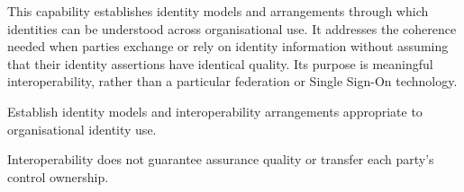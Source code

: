 This capability establishes identity models and arrangements through which identities can be understood across organisational use. It addresses the coherence needed when parties exchange or rely on identity information without assuming that their identity assertions have identical quality. Its purpose is meaningful interoperability, rather than a particular federation or Single Sign-On technology.



Establish identity models and interoperability arrangements appropriate to organisational identity use.



Interoperability does not guarantee assurance quality or transfer each party's control ownership.


